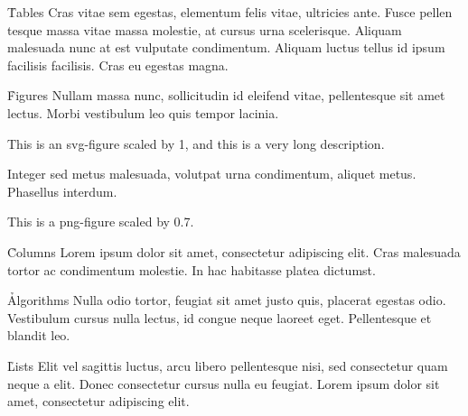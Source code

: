 \documentclass[twocolumn]{paper}
\begin{document}

\h{Tables}
Cras vitae sem egestas, elementum felis vitae, ultricies ante. Fusce pellen tesque massa vitae massa molestie, at cursus urna scelerisque. Aliquam malesuada nunc at est vulputate condimentum. Aliquam luctus tellus id ipsum facilisis facilisis. Cras eu egestas magna.


\h{Figures}
Nullam massa nunc, sollicitudin id eleifend vitae, pellentesque sit amet lectus. Morbi vestibulum leo quis tempor lacinia.

    {This is an svg-figure scaled by 1, and this is a very long description.}

Integer sed metus malesuada, volutpat urna condimentum, aliquet metus. Phasellus interdum.

    {This is a png-figure scaled by 0.7.}


\h{Columns}
Lorem ipsum dolor sit amet, consectetur adipiscing elit. Cras malesuada tortor ac condimentum molestie. In hac habitasse platea dictumst.


\h{Algorithms}
Nulla odio tortor, feugiat sit amet justo quis, placerat egestas odio. Vestibulum cursus nulla lectus, id congue neque laoreet eget. Pellentesque et blandit leo.


\h{Lists}
Elit vel sagittis luctus, arcu libero pellentesque nisi, sed consectetur quam neque a elit. Donec consectetur cursus nulla eu feugiat. Lorem ipsum dolor sit amet, consectetur adipiscing elit.

\end{document}
